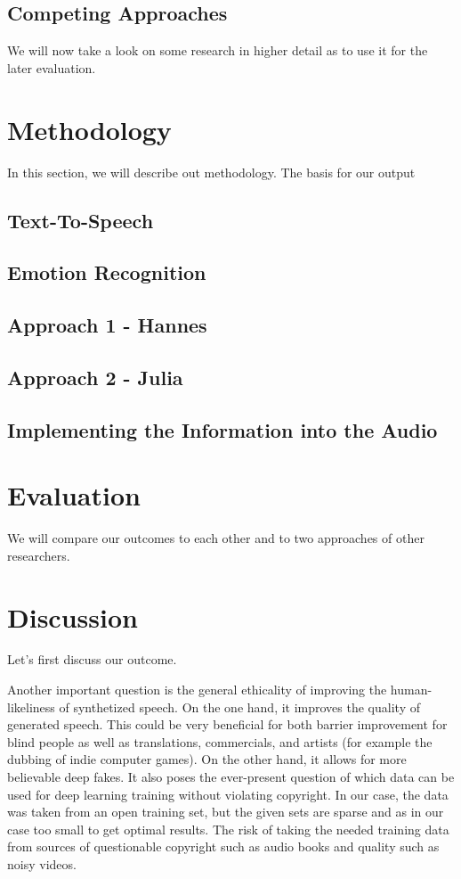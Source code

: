 \documentclass[11pt]{article}
\begin{document}
\subsection{Competing Approaches}
We will now take a look on some research in higher detail as to use it for the later evaluation.


\section{Methodology}
In this section, we will describe out methodology. The basis for our output

\subsection{Text-To-Speech}

\subsection{Emotion Recognition}

\subsection{Approach 1 - Hannes}

\subsection{Approach 2 - Julia}

\subsection{Implementing the Information into the Audio}

\section{Evaluation}

We will compare our outcomes to each other and to two approaches of other researchers.

\section{Discussion}
Let's first discuss our outcome.

Another important question is the general ethicality of improving the human-likeliness of synthetized speech. On the one hand, it improves the quality of generated speech. This could be very beneficial for both barrier improvement for blind people as well as translations, commercials, and artists (for example the dubbing of indie computer games). On the other hand, it allows for more believable deep fakes. It also poses the ever-present question of which data can be used for deep learning training without violating copyright. In our case, the data was taken from an open training set, but the given sets are sparse and as in our case too small to get optimal results. The risk of taking the needed training data from sources of questionable copyright such as audio books and quality such as noisy videos.
\end{document}
